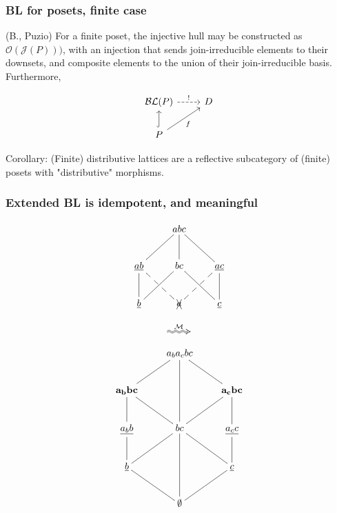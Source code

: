 \documentclass{beamer}
\newcommand{\Mcc}{\mathcal{M}}
\newcommand{\Oc}{\mathcal{O}}
\newcommand{\Jc}{\mathcal{J}}
\newcommand{\BLc}{\mathcal{BL}}
\begin{document}
\begin{frame}[fragile]
\frametitle{BL for posets, finite case}

\begin{theorem}
(B., Puzio) For a finite poset, the injective hull may be constructed as \(\Oc(\Jc(P)))\), with an injection that sends join-irreducible elements to their downsets, and composite elements to the union of their join-irreducible basis. Furthermore, 

\begin{equation*}
\begin{tikzcd}
\BLc(P) \arrow[r, "!",dashed]            & D \\
P \arrow[u, hook] \arrow[ru, "f"'] &  
\end{tikzcd}
\end{equation*}

\end{theorem}

Corollary: (Finite) distributive lattices are a reflective subcategory of (finite) posets with "distributive" morphisms.
\end{frame}

\begin{frame}
\frametitle{Extended BL is idempotent, and meaningful}
\begin{figure}
\begin{minipage}[c]{0.4\textwidth}
\begin{equation*}
    \xymatrix{& abc \ar@{-}[dl] \ar@{-}[d] \ar@{-}[dr] & \\
      \underline{ab} \ar@{-}[d] \ar@{--}[dr] & bc \ar@{-}[dl] \ar@{-}[dr] &
        \underline{ac} \ar@{-}[d] \ar@{--}[dl] \\
        \underline{b} & \xcancel{a}  & \underline{c} }         
\end{equation*}
\end{minipage}
\begin{minipage}[c]{0.08\textwidth}
  \begin{equation*}
    \xymatrix{\ar@2{~>}[r]^{\Mcc} &}
  \end{equation*}
\end{minipage}
\begin{minipage}[c]{0.4\textwidth}
\begin{equation*}
    \xymatrix{& a_ba_cbc \ar@{-}[dl] \ar@{-}[dd] \ar@{-}[dr] & \\
      \mathbf{a_bbc} \ar@{-}[d] \ar@{-}[dr] & &
        \mathbf{a_cbc} \ar@{-}[d] \ar@{-}[dl]\\
        \underline{a_bb} \ar@{-}[d] & bc \ar@{-}[dl] \ar@{-}[dd] \ar@{-}[dr] &
          \underline{a_cc} \ar@{-}[d] \\
         \underline{b} \ar@{-}[dr] & & \underline{c} \ar@{-}[dl] \\
      & \mathbf{\emptyset} }
\end{equation*}
\end{minipage}
\end{figure}
\end{frame}
\end{document}
